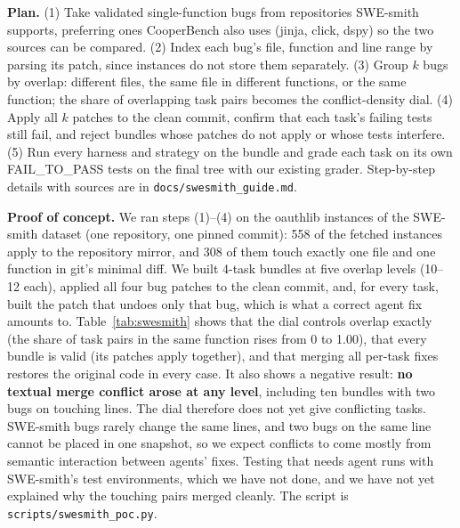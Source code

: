 \documentclass[sigconf,nonacm]{acmart}
\begin{document}
\textbf{Plan.} (1) Take validated single-function bugs from repositories SWE-smith supports, preferring ones CooperBench also uses (jinja, click, dspy) so the two sources can be compared. (2) Index each bug's file, function and line range by parsing its patch, since instances do not store them separately. (3) Group $k$ bugs by overlap: different files, the same file in different functions, or the same function; the share of overlapping task pairs becomes the conflict-density dial. (4) Apply all $k$ patches to the clean commit, confirm that each task's failing tests still fail, and reject bundles whose patches do not apply or whose tests interfere. (5) Run every harness and strategy on the bundle and grade each task on its own FAIL\_TO\_PASS tests on the final tree with our existing grader. Step-by-step details with sources are in \texttt{docs/swesmith\_guide.md}.

\begin{table}[t]
\caption{SWE-smith proof of concept (oauthlib, $k{=}4$). Same fn: share of task pairs in one function; Near: pairs within 3 lines; Conflict: share of task pairs whose fixes conflict under \texttt{git merge}; Restored: bundles whose merged fixes restore the clean code.}
\label{tab:swesmith}
\scriptsize

\end{table}

\textbf{Proof of concept.} We ran steps (1)--(4) on the oauthlib instances of the SWE-smith dataset (one repository, one pinned commit): 558 of the fetched instances apply to the repository mirror, and 308 of them touch exactly one file and one function in git's minimal diff. We built 4-task bundles at five overlap levels (10--12 each), applied all four bug patches to the clean commit, and, for every task, built the patch that undoes only that bug, which is what a correct agent fix amounts to. Table~\ref{tab:swesmith} shows that the dial controls overlap exactly (the share of task pairs in the same function rises from 0 to 1.00), that every bundle is valid (its patches apply together), and that merging all per-task fixes restores the original code in every case. It also shows a negative result: \textbf{no textual merge conflict arose at any level}, including ten bundles with two bugs on touching lines. The dial therefore does not yet give conflicting tasks. SWE-smith bugs rarely change the same lines, and two bugs on the same line cannot be placed in one snapshot, so we expect conflicts to come mostly from semantic interaction between agents' fixes. Testing that needs agent runs with SWE-smith's test environments, which we have not done, and we have not yet explained why the touching pairs merged cleanly. The script is \texttt{scripts/swesmith\_poc.py}.
\end{document}
